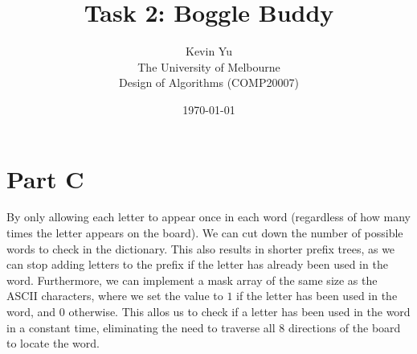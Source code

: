 \documentclass[12pt]{article}
\title{Task 2: Boggle Buddy}
\author{Kevin Yu \\ The University of Melbourne \\ Design of Algorithms (COMP20007)}
\date{\today}
\begin{document}
\maketitle

\section{Part C}

By only allowing each letter to appear once in each word (regardless of how many times the letter appears on the board). We can cut down the number of possible words to check in the dictionary. This also results in shorter prefix trees, as we can stop adding letters to the prefix if the letter has already been used in the word. Furthermore, we can implement a mask array of the same size as the ASCII characters, where we set the value to $1$ if the letter has been used in the word, and $0$ otherwise. This allos us to check if a letter has been used in the word in a constant time, eliminating the need to traverse all 8 directions of the board to locate the word.
\end{document}
